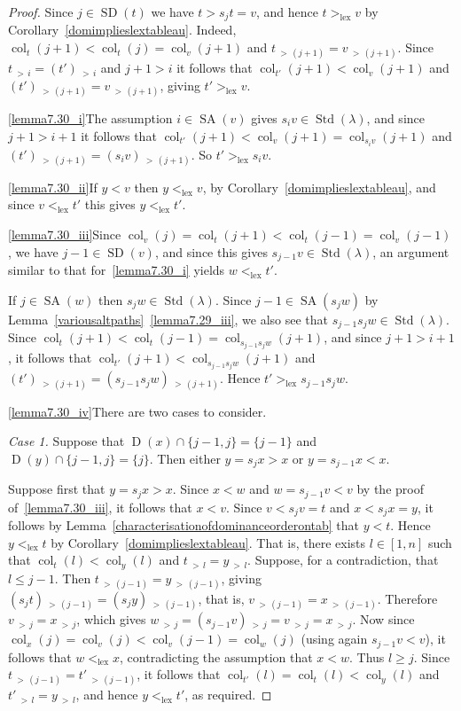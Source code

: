 \documentclass[10pt]{amsart}
\theoremstyle{definition}
\newenvironment{Case}[1]{\smallskip\noindent\emph{Case #1}\endgraf
 \nobreak\noindent\ignorespaces}{\endgraf\smallskip}
\DeclareMathOperator{\lex}{lex}
\DeclareMathOperator{\col}{col}
\newcommand{\morethan}[2]{#1\,{_{>\,#2}}}
\DeclareMathOperator{\STD}{Std}
\DeclareMathOperator{\SD}{SD}
\DeclareMathOperator{\SA}{SA}
\DeclareMathOperator{\D}{D}
\begin{document}
\begin{proof}
Since $j\in\SD(t)$ we have $t>s_jt=v$, and hence
$t>_{\lex}v$ by Corollary~\ref{domimplieslextableau}. Indeed,
$\col_t(j+1)<\col_t(j)=\col_v(j+1)$ and $\morethan t{(j+1)}=\morethan v{(j+1)}$.
Since $\morethan ti=\morethan {(t')}i$ and $j+1>i$ it follows that
$\col_{t'}(j+1)<\col_v(j+1)$ and
$\morethan {(t')}{(j+1)}=\morethan v{(j+1)}$,
giving $t'>_{\lex}v$.

\ref{lemma7.30_i}\quad The assumption $i\in\SA(v)$ gives $s_iv\in\STD(\lambda)$,
and since $j+1>i+1$ it follows that $\col_{t'}(j+1)<\col_v(j+1)=\col_{s_iv}(j+1)$
and $\morethan{(t')}{(j+1)}=\morethan{(s_iv)}{(j+1)}$. So $t'>_{\lex}s_iv$.

\ref{lemma7.30_ii}\quad If $y<v$ then $y<_{\lex} v$, by Corollary~\ref{domimplieslextableau}, and
since $v<_{\lex} t'$ this gives $y<_{\lex}t'$.

\ref{lemma7.30_iii}\quad Since $\col_v(j)=\col_t(j+1)<\col_t(j-1)=\col_v(j-1)$, we have
$j-1\in\SD(v)$, and since this gives $s_{j-1}v\in\STD(\lambda)$, an argument similar
to that for~\ref{lemma7.30_i} yields $w<_{\lex}t'$.

If $j\in\SA(w)$ then $s_jw\in\STD(\lambda)$. Since $j-1\in\SA(s_jw)$
by Lemma~\ref{variousaltpaths}~\ref{lemma7.29_iii}, we also see that $s_{j-1}s_jw\in\STD(\lambda)$.
Since $\col_t(j+1)<\col_t(j-1)=\col_{s_{j-1}s_jw}(j+1)$, and
since $j+1>i+1$, it follows that $\col_{t'}(j+1)<\col_{s_{j-1}s_jw}(j+1)$ and
$\morethan{(t')}{(j+1)}=\morethan{(s_{j-1}s_jw)}{(j+1)}$. Hence $t'>_{\lex}s_{j-1}s_jw$.

\ref{lemma7.30_iv}\quad There are two cases to consider.

\begin{Case}{1.} Suppose that $\D(x)\cap\{j-1,j\}=\{j-1\}$ and $\D(y)\cap\{j-1,j\}=\{j\}$.
Then either $y=s_jx>x$ or $y=s_{j-1}x<x$.

Suppose first that $y=s_{j}x>x$. Since $x<w$ and $w=s_{j-1}v<v$ by the proof of~\ref{lemma7.30_iii}, it
follows that $x<v$. Since $v<s_jv=t$ and $x<s_jx=y$, it follows by
 Lemma~\ref{characterisationofdominanceorderontab} that $y<t$. Hence
$y<_{\lex}t$ by Corollary~\ref{domimplieslextableau}. That is, there exists
$l\in[1,n]$ such that $\col_{t}(l)<\col_y(l)$ and
$\morethan tl=\morethan yl$. Suppose, for a contradiction, that $l\leqslant j-1$.
Then $\morethan t{(j-1)}=\morethan y{(j-1)}$, giving
$\morethan {(s_jt)}{(j-1)}=\morethan{(s_jy)}{(j-1)}$, that is,
$\morethan v{(j-1)}=\morethan x{(j-1)}$. Therefore $\morethan vj=\morethan xj$, which
gives $\morethan wj=\morethan{(s_{j-1}v)}j=\morethan vj=\morethan xj$.
Now since $\col_x(j)=\col_v(j)<\col_v(j-1)=\col_w(j)$ (using again
$s_{j-1}v<v$), it follows that $w<_{\lex}x$,
contradicting the assumption that $x<w$. Thus $l\geqslant j$. Since
$\morethan t{(j-1)}=\morethan {t'}{(j-1)}$, it follows that $\col_{t'}(l)=\col_t(l)<\col_y(l)$
and $\morethan {t'}l=\morethan yl$, and hence $y<_{\lex}t'$, as required.


\end{Case}
\end{proof}
\end{document}
